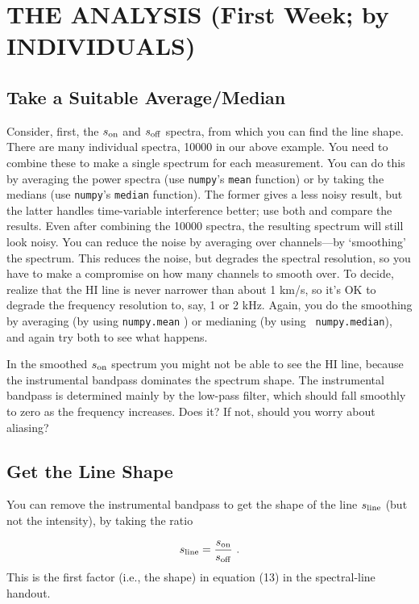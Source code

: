 \documentclass[11pt,preprint]{aastex}
\begin{document}
\section{THE ANALYSIS (First Week; by INDIVIDUALS)} \label{analysis}

\subsection{Take a Suitable Average/Median}
Consider, first, the $s_{\rm on}$ and $s_{\rm off}$ spectra, from which
you can find the line shape. There are many individual spectra, 10000 in
our above example. You need to combine these to make a single spectrum
for each measurement. You can do this by averaging the power spectra
(use {\tt numpy}'s {\tt mean} function) or by taking the medians (use {\tt numpy}'s
{\tt median} function). The former gives a less noisy result, but the
latter handles time-variable interference better; use both and compare
the results. Even after combining the 10000 spectra, the resulting
spectrum will still look noisy.  You can reduce the noise by averaging
over channels---by `smoothing' the spectrum. This reduces the noise, but
degrades the spectral resolution, so you have to make a compromise on
how many channels to smooth over. To decide, realize that the HI line is
never narrower than about 1 km/s, so it's OK to degrade the frequency
resolution to, say, 1 or 2 kHz. Again, you do the smoothing by averaging
(by using {\tt numpy.mean} ) or medianing (by using {\tt
  numpy.median}), and again try both to see what happens.

In the smoothed $s_{\rm on}$ spectrum you might not be able to see the
HI line, because the instrumental bandpass dominates the spectrum
shape. The instrumental bandpass is determined mainly by the low-pass
filter, which should fall smoothly to zero as the frequency
increases. Does it? If not, should you worry about aliasing?

\subsection{Get the Line Shape}

You can remove the instrumental bandpass to get the shape
of the line $s_{\rm line}$ (but not the intensity), by taking the ratio 

\begin{equation}
s_{\rm line} = \frac{s_{\rm on}}{s_{\rm off}} \ .
\end{equation}
%
This is the first factor (i.e., the shape) in equation
(13) in the spectral-line handout.
%
\end{document}

